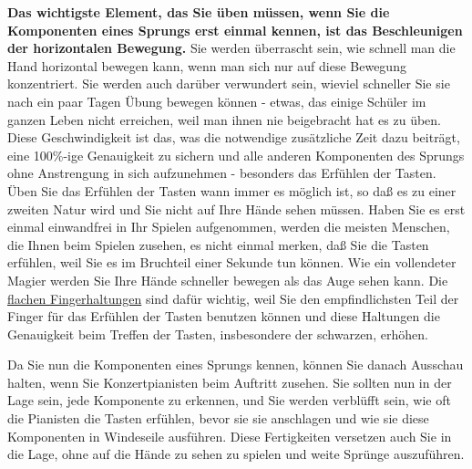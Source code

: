 \textbf{Das wichtigste Element, das Sie üben müssen, wenn Sie die Komponenten eines Sprungs erst einmal kennen, ist das Beschleunigen der horizontalen Bewegung.}
Sie werden überrascht sein, wie schnell man die Hand horizontal bewegen kann, wenn man sich nur auf diese Bewegung konzentriert.
Sie werden auch darüber verwundert sein, wieviel schneller Sie sie nach ein paar Tagen Übung bewegen können - etwas, das einige Schüler im ganzen Leben nicht erreichen, weil man ihnen nie beigebracht hat es zu üben.
Diese Geschwindigkeit ist das, was die notwendige zusätzliche Zeit dazu beiträgt, eine 100\%-ige Genauigkeit zu sichern und alle anderen Komponenten des Sprungs ohne Anstrengung in sich aufzunehmen - besonders das Erfühlen der Tasten.
Üben Sie das Erfühlen der Tasten wann immer es möglich ist, so daß es zu einer zweiten Natur wird und Sie nicht auf Ihre Hände sehen müssen.
Haben Sie es erst einmal einwandfrei in Ihr Spielen aufgenommen, werden die meisten Menschen, die Ihnen beim Spielen zusehen, es nicht einmal merken, daß Sie die Tasten erfühlen, weil Sie es im Bruchteil einer Sekunde tun können.
Wie ein vollendeter Magier werden Sie Ihre Hände schneller bewegen als das Auge sehen kann.
Die \hyperlink{c1iii4b}{flachen Fingerhaltungen} sind dafür wichtig, weil Sie den empfindlichsten Teil der Finger für das Erfühlen der Tasten benutzen können und diese Haltungen die Genauigkeit beim Treffen der Tasten, insbesondere der schwarzen, erhöhen.

Da Sie nun die Komponenten eines Sprungs kennen, können Sie danach Ausschau halten, wenn Sie Konzertpianisten beim Auftritt zusehen.
Sie sollten nun in der Lage sein, jede Komponente zu erkennen, und Sie werden verblüfft sein, wie oft die Pianisten die Tasten erfühlen, bevor sie sie anschlagen und wie sie diese Komponenten in Windeseile ausführen.
Diese Fertigkeiten versetzen auch Sie in die Lage, ohne auf die Hände zu sehen zu spielen und weite Sprünge auszuführen.

